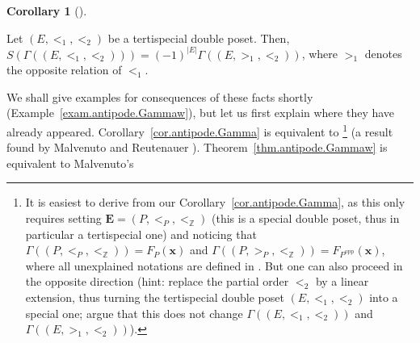 \documentclass[numbers=enddot,12pt,final,onecolumn,notitlepage,abstracton]{scrartcl}
\theoremstyle{definition}
\newtheorem{coro}[theo]{Corollary}
\newenvironment{corollary}[1][]
{\begin{coro}[#1]\begin{leftbar}}
{\end{leftbar}\end{coro}}
\newcommand{\xx}{{\mathbf{x}}}
\newcommand{\EE}{{\mathbf{E}}}
\newcommand{\ZZ}{{\mathbb{Z}}}
\begin{document}
\begin{corollary}
\label{cor.antipode.Gamma}
Let $\left(E, <_1, <_2\right)$ be a tertispecial double poset.
Then, $S\left(\Gamma\left(\left(E, <_1, <_2\right)\right)\right)
= \left(-1\right)^{\left|E\right|}
\Gamma\left(\left(E, >_1, <_2\right)\right)$,
where $>_1$ denotes the opposite relation of $<_1$.
\end{corollary}

We shall give examples for consequences of these facts shortly
(Example~\ref{exam.antipode.Gammaw}), but
let us first explain where they have already appeared.
Corollary~\ref{cor.antipode.Gamma} is equivalent to
\cite[Corollary 5.2.20]{Reiner}\footnote{It is easiest to derive
\cite[Corollary 5.2.20]{Reiner} from our Corollary~\ref{cor.antipode.Gamma},
as this only requires setting $\EE = \left(P, <_P, <_{\ZZ}\right)$
(this is a special double poset, thus in particular a tertispecial
one) and noticing that
$\Gamma\left(\left(P, <_P, <_{\ZZ}\right)\right)
= F_P\left(\xx\right)$ and
$\Gamma\left(\left(P, >_P, <_{\ZZ}\right)\right)
= F_{P^{\operatorname{opp}}}\left(\xx\right)$, where all unexplained
notations are defined in \cite[Chapter 5]{Reiner}. But one can also
proceed in the opposite direction (hint: replace the partial order
$<_2$ by a linear extension, thus turning the tertispecial double
poset $\left(E, <_1, <_2\right)$ into a special one; argue that
this does not change $\Gamma\left(\left(E, <_1, <_2\right)\right)$
and $\Gamma\left(\left(E, >_1, <_2\right)\right)$).}
(a result found by Malvenuto and Reutenauer
\cite[Lemma 3.2]{Mal-Reu}).
Theorem~\ref{thm.antipode.Gammaw} is equivalent to Malvenuto's
\end{document}
